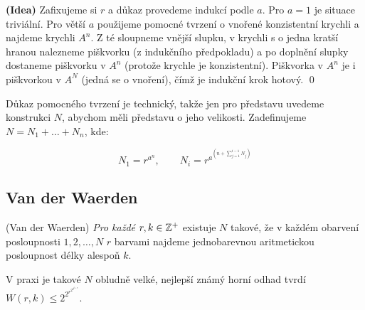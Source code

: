 \dk \textbf{(Idea)} Zafixujeme si $r$ a důkaz provedeme indukcí podle $a$. Pro $a=1$ je situace triviální. Pro větší $a$ použijeme pomocné tvrzení o vnořené konzistentní krychli a najdeme krychli $A^n$. Z té sloupneme vnější slupku, v krychli s o jedna kratší hranou nalezneme piškvorku (z indukčního předpokladu) a po doplnění slupky dostaneme piškvorku v $A^n$ (protože krychle je konzistentní). Piškvorka v $A^n$ je i piškvorkou v $A^N$ (jedná se o vnoření), čímž je indukční krok hotový.
\qed

Důkaz pomocného tvrzení je technický, takže jen pro představu uvedeme konstrukci $N$, abychom měli představu o jeho velikosti. Zadefinujeme $N = N_1 + \dots + N_n$, kde:

$$N_1 = r^{a^n},\qquad N_i = r^{a^{\left(n+\sum_{j=1}^{i-1} N_j\right)}}$$

\subsection{Van der Waerden}

\vt (Van der Waerden) {\it Pro každé $r, k \in \mathbb{Z}^+$} existuje $N$ takové, že v každém obarvení posloupnosti ${1, 2, \dots, N}$ $r$ barvami najdeme jednobarevnou aritmetickou posloupnost délky alespoň $k$.

V praxi je takové $N$ obludně velké, nejlepší známý horní odhad tvrdí $W(r,k) \le 2^{2^{r^{2^{2^{k+9}}}}}$.


